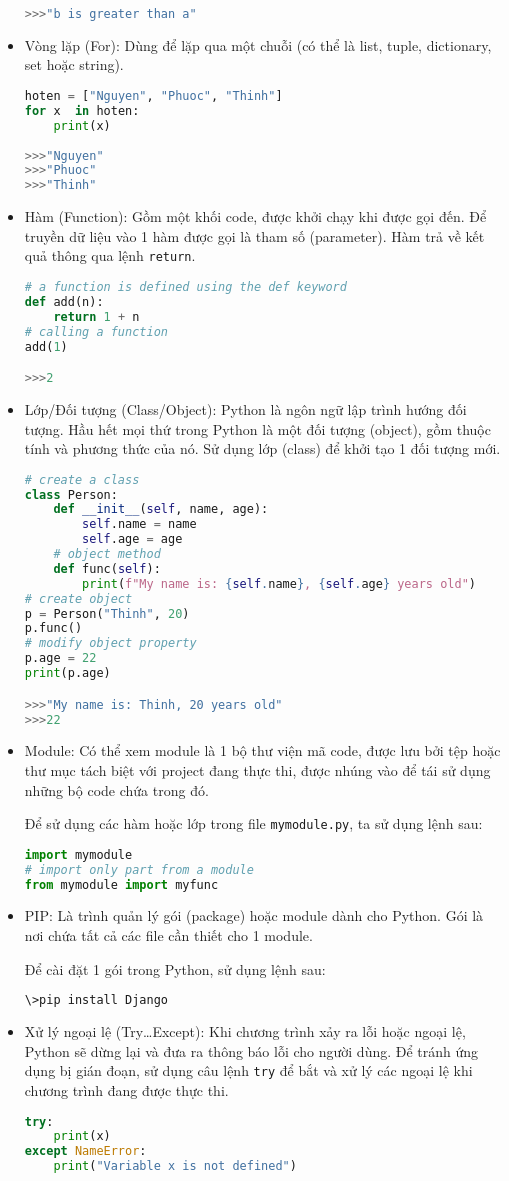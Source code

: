 \begin{itemize}
\begin{lstlisting}[language=Python]
>>>"b is greater than a"
	\end{lstlisting}
	\item Vòng lặp (For): Dùng để lặp qua một chuỗi (có thể là list, tuple, dictionary, set hoặc string).
	\begin{lstlisting}[language=Python]
hoten = ["Nguyen", "Phuoc", "Thinh"]
for x  in hoten:
	print(x)
	
>>>"Nguyen"
>>>"Phuoc"
>>>"Thinh"
	\end{lstlisting}
	\item Hàm (Function): Gồm một khối code, được khởi chạy khi được gọi đến. Để truyền dữ liệu vào 1 hàm được gọi là tham số (parameter). Hàm trả về kết quả thông qua lệnh \texttt{return}.
	\begin{lstlisting}[language=Python]
# a function is defined using the def keyword
def add(n):
	return 1 + n
# calling a function
add(1)

>>>2
	\end{lstlisting}
	\item Lớp/Đối tượng (Class/Object): Python là ngôn ngữ lập trình hướng đối tượng. Hầu hết mọi thứ trong Python là một đối tượng (object), gồm thuộc tính và phương thức của nó. Sử dụng lớp (class) để khởi tạo 1 đối tượng mới.
	\begin{lstlisting}[language=Python]
# create a class
class Person:
	def __init__(self, name, age):
		self.name = name
		self.age = age
	# object method
	def func(self):
		print(f"My name is: {self.name}, {self.age} years old")
# create object
p = Person("Thinh", 20)
p.func()
# modify object property
p.age = 22
print(p.age)

>>>"My name is: Thinh, 20 years old"
>>>22
	\end{lstlisting}
	\item Module: Có thể xem module là 1 bộ thư viện mã code, được lưu bởi tệp hoặc thư mục tách biệt với project đang thực thi, được nhúng vào để tái sử dụng những bộ code chứa trong đó.
	\par
	Để sử dụng các hàm hoặc lớp trong file \texttt{mymodule.py}, ta sử dụng lệnh sau:
	\begin{lstlisting}[language=Python]
import mymodule
# import only part from a module
from mymodule import myfunc
	\end{lstlisting}
	\item PIP: Là trình quản lý gói (package) hoặc module dành cho Python. Gói là nơi chứa tất cả các file cần thiết cho 1 module.
	\par
	Để cài đặt 1 gói trong Python, sử dụng lệnh sau:
	\begin{lstlisting}[language=bash]
\>pip install Django
	\end{lstlisting}
	\item Xử lý ngoại lệ (Try\ldots Except): Khi chương trình xảy ra lỗi hoặc ngoại lệ, Python sẽ dừng lại và đưa ra thông báo lỗi cho người dùng. Để tránh ứng dụng bị gián đoạn, sử dụng câu lệnh \texttt{try} để bắt và xử lý các ngoại lệ khi chương trình đang được thực thi.
	\begin{lstlisting}[language=Python]
try:
	print(x)
except NameError:
	print("Variable x is not defined")
	

\end{lstlisting}
\end{itemize}
